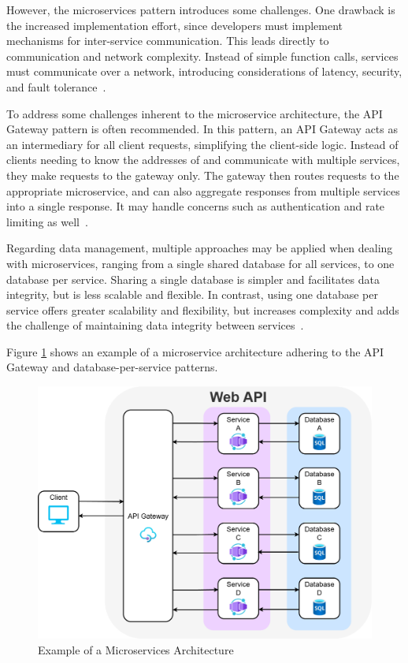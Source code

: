 \documentclass[12pt,reqno, oneside]{amsbook}
\theoremstyle{definition}
\theoremstyle{definition}
\numberwithin{section}{chapter}
\numberwithin{table}{chapter}
\numberwithin{figure}{chapter}
\begin{document}
However, the microservices pattern introduces some challenges. One drawback is the increased implementation effort, since developers must implement mechanisms for inter-service communication. This leads directly to communication and network complexity. Instead of simple function calls, services must communicate over a network, introducing considerations of latency, security, and fault tolerance~\cite{Taibi2018, Adrio2023, Khalfaoui2025, Figueira2024, Kenan2020, Villamizar2015, Yoo2025}.

To address some challenges inherent to the microservice architecture, the API Gateway pattern is often recommended. In this pattern, an API Gateway acts as an intermediary for all client requests, simplifying the client-side logic. Instead of clients needing to know the addresses of and communicate with multiple services, they make requests to the gateway only. The gateway then routes requests to the appropriate microservice, and can also aggregate responses from multiple services into a single response. It may handle concerns such as authentication and rate limiting as well~\cite{Taibi2018, Adrio2023, Khalfaoui2025, Kenan2020}.

Regarding data management, multiple approaches may be applied when dealing with microservices, ranging from a single shared database for all services, to one database per service. Sharing a single database is simpler and facilitates data integrity, but is less scalable and flexible. In contrast, using one database per service offers greater scalability and flexibility, but increases complexity and adds the challenge of maintaining data integrity between services~\cite{Taibi2018, Khalfaoui2025, Kenan2020}.

Figure \ref{Figure:Microservices_Architecture} shows an example of a microservice architecture adhering to the \ac{API} Gateway and database-per-service patterns.

\FloatBarrier
\begin{figure}[H]
  \includegraphics[width=0.9\linewidth]{images/MicroservicesArchitecture.png}
  \caption{\label{Figure:Microservices_Architecture}Example of a Microservices Architecture}
\end{figure}
\FloatBarrier
\end{document}
